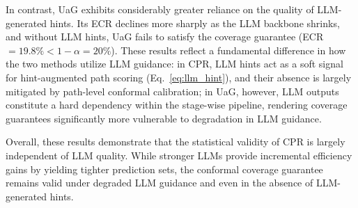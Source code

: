 \documentclass{article}
\theoremstyle{plain}
\theoremstyle{definition}
\theoremstyle{remark}
\begin{document}
In contrast, UaG exhibits considerably greater reliance on the quality of LLM-generated hints. Its ECR declines more sharply as the LLM backbone shrinks, and without LLM hints, UaG fails to satisfy the coverage guarantee (ECR $= 19.8\% < 1-\alpha = 20\%$). These results reflect a fundamental difference in how the two methods utilize LLM guidance: in CPR, LLM hints act as a soft signal for hint-augmented path scoring (Eq.~\ref{eq:llm_hint}), and their absence is largely mitigated by path-level conformal calibration; in UaG, however, LLM outputs constitute a hard dependency within the stage-wise pipeline, rendering coverage guarantees significantly more vulnerable to degradation in LLM guidance.

Overall, these results demonstrate that the statistical validity of CPR is largely independent of LLM quality. While stronger LLMs provide incremental efficiency gains by yielding tighter prediction sets, the conformal coverage guarantee remains valid under degraded LLM guidance and even in the absence of LLM-generated hints.



\end{document}
